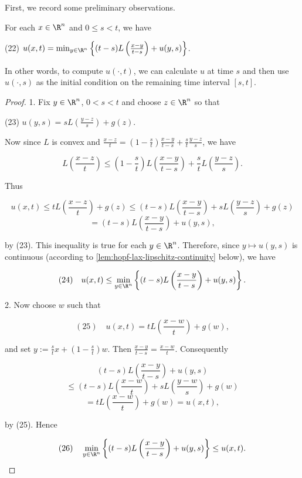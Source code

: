 First, we record some preliminary observations.

\begin{lemma}
\label{lem:hopf-lax-functional-identity}
For each $x \in \R^n$ and $0 \le s < t$, we have

(22) \hspace{1em} $u(x,t) = \min_{y \in \R^n} \left\{ (t-s)L\left(\frac{x-y}{t-s}\right) + u(y,s) \right\}$.

In other words, to compute $u(\cdot,t)$, we can calculate $u$ at time $s$ and then use $u(\cdot, s)$ as the initial condition on the remaining time interval $[s,t]$.
\end{lemma}

\begin{proof}
1. Fix $y \in \R^n$, $0 < s < t$ and choose $z \in \R^n$ so that

(23) \hspace{1em} $u(y,s) = sL\left(\frac{y-z}{s}\right) + g(z)$.

Now since $L$ is convex and $\frac{x-z}{t} = \left(1-\frac{s}{t}\right)\frac{x-y}{t-s} + \frac{s}{t}\frac{y-z}{s}$, we have

$$L\left(\frac{x-z}{t}\right) \le \left(1-\frac{s}{t}\right)L\left(\frac{x-y}{t-s}\right) + \frac{s}{t}L\left(\frac{y-z}{s}\right).$$

Thus

$$u(x,t) \le tL\left(\frac{x-z}{t}\right) + g(z) \le (t-s)L\left(\frac{x-y}{t-s}\right) + sL\left(\frac{y-z}{s}\right) + g(z)$$
$$= (t-s)L\left(\frac{x-y}{t-s}\right) + u(y,s),$$

by (23). This inequality is true for each $y \in \R^n$. Therefore, since $y \mapsto u(y,s)$ is continuous (according to \cref{lem:hopf-lax-lipschitz-continuity} below), we have

$$(24) \quad u(x,t) \le \min_{y \in \R^n}\left\{(t-s)L\left(\frac{x-y}{t-s}\right) + u(y,s)\right\}.$$

2. Now choose $w$ such that

$$(25) \quad u(x,t) = tL\left(\frac{x-w}{t}\right) + g(w),$$

and set $y := \frac{s}{t}x + \left(1-\frac{s}{t}\right)w$. Then $\frac{x-y}{t-s} = \frac{x-w}{t}$. Consequently

$$(t-s)L\left(\frac{x-y}{t-s}\right) + u(y,s)$$
$$\le (t-s)L\left(\frac{x-w}{t}\right) + sL\left(\frac{y-w}{s}\right) + g(w)$$
$$= tL\left(\frac{x-w}{t}\right) + g(w) = u(x,t),$$

by (25). Hence

$$(26) \quad \min_{y \in \R^n}\left\{(t-s)L\left(\frac{x-y}{t-s}\right) + u(y,s)\right\} \le u(x,t).$$
\end{proof}

